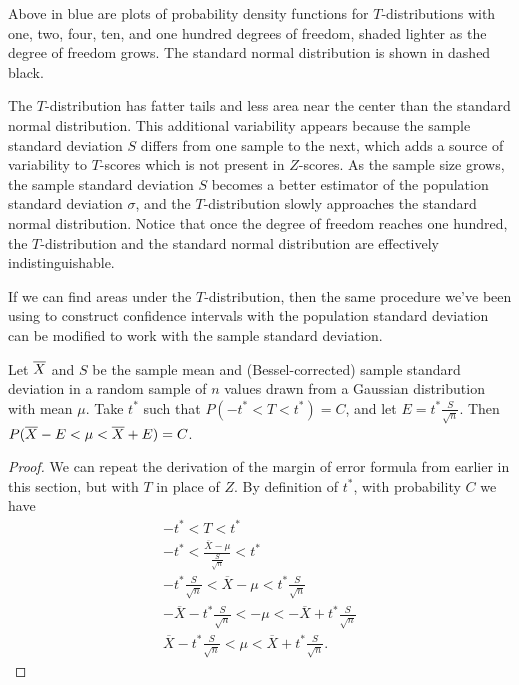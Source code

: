 Above in blue are plots of probability density functions for $T$-distributions with one, two, four, ten, and one hundred degrees of freedom, shaded lighter as the degree of freedom grows. The standard normal distribution is shown in dashed black.

The $T$-distribution has fatter tails and less area near the center than the standard normal distribution. This additional variability appears because the sample standard deviation $S$ differs from one sample to the next, which adds a source of variability to $T$-scores which is not present in $Z$-scores. As the sample size grows, the sample standard deviation $S$ becomes a better estimator of the population standard deviation $\sigma$, and the $T$-distribution slowly approaches the standard normal distribution. Notice that once the degree of freedom reaches one hundred, the $T$-distribution and the standard normal distribution are effectively indistinguishable.

If we can find areas under the $T$-distribution, then the same procedure we've been using to construct confidence intervals with the population standard deviation can be modified to work with the sample standard deviation.

\begin{proposition} Let ${\overline{X}}$ and $S$ be the sample mean and (Bessel-corrected) sample standard deviation in a random sample of $n$ values drawn from a Gaussian distribution with mean $\mu$. Take $t^*$ such that $P(-t^* < T < t^*) = C$, and let $E = t^*\frac{S}{\sqrt{n}}$. Then $P({\overline{X}} - E < \mu < {\overline{X}} + E) = C$.
\end{proposition}
\begin{proof}
We can repeat the derivation of the margin of error formula from earlier in this section, but with $T$ in place of $Z$. By definition of $t^*$, with probability $C$ we have
\begin{gather*}
-t^* < T < t^* \\
-t^* < \textstyle\frac{\overline{X}- \mu}{\frac{S}{\sqrt{n}}} < t^* \\
-t^* \textstyle\frac{S}{\sqrt{n}} < \overline{X}- \mu < t^* \frac{S}{\sqrt{n}} \\[0.2ex]
-\overline{X}-t^* \textstyle\frac{S}{\sqrt{n}} < - \mu < -\overline{X}+t^* \frac{S}{\sqrt{n}} \\[0.3ex]
\overline{X}-t^* \textstyle\frac{S}{\sqrt{n}} <  \mu < \overline{X}+t^* \frac{S}{\sqrt{n}}.
\end{gather*}
\end{proof}

